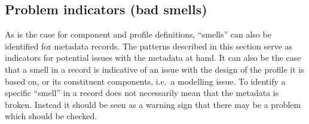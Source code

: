 \subsection{Problem indicators (bad smells)} \label{authoring-bad-smells}

As is the case for component and profile definitions, ``smells'' can also be identified for metadata records. The patterns described in this section serve as indicators for potential issues with the metadata at hand. It can also be the case that a smell in a record is indicative of an issue with the design of the profile it is based on, or its constituent components, i.e.~a modelling issue. To identify a specific
``smell'' in a record does not necessarily mean that the metadata is broken. Instead it should be seen as a warning sign that there may be a problem which should be checked.

